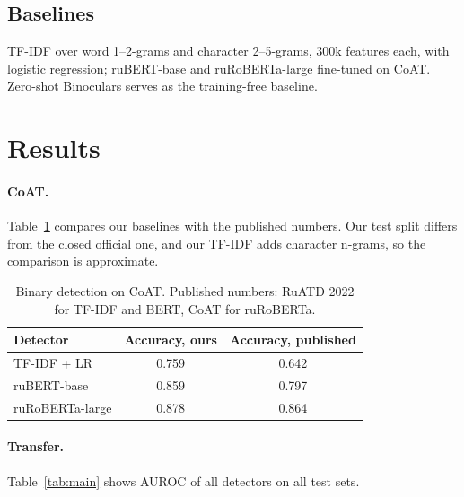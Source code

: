 \documentclass{article}
\begin{document}
\subsection{Baselines}
TF-IDF over word 1--2-grams and character 2--5-grams, 300k features each, with logistic regression; ruBERT-base
and ruRoBERTa-large fine-tuned on CoAT. Zero-shot Binoculars serves as the training-free baseline.


\section{Results}
\paragraph{CoAT.} Table~\ref{tab:coat} compares our baselines with the published numbers. Our test split differs
from the closed official one, and our TF-IDF adds character n-grams, so the comparison is approximate.

\begin{table}[tbh!]
\begin{center}
\begin{tabular}{|l|cc|}
\hline
Detector & Accuracy, ours & Accuracy, published \\
\hline
TF-IDF + LR & 0.759 & 0.642 \\
ruBERT-base & 0.859 & 0.797 \\
ruRoBERTa-large & 0.878 & 0.864 \\
\hline
\end{tabular}
\caption{Binary detection on CoAT. Published numbers: RuATD 2022 for TF-IDF and BERT, CoAT for ruRoBERTa.}
\label{tab:coat}
\end{center}
\end{table}

\paragraph{Transfer.} Table~\ref{tab:main} shows AUROC of all detectors on all test sets.
\end{document}
